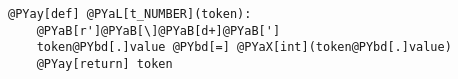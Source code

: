 \begin{Verbatim}[commandchars=@\[\]]
@PYay[def] @PYaL[t_NUMBER](token):
    @PYaB[r']@PYaB[\]@PYaB[d+]@PYaB[']
    token@PYbd[.]value @PYbd[=] @PYaX[int](token@PYbd[.]value)
    @PYay[return] token
\end{Verbatim}
